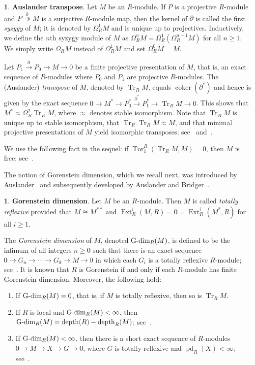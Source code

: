 \documentclass[11pt]{amsart}
\theoremstyle{definition}
\theoremstyle{definition}
\newtheorem{chunk}[thm]{\hspace*{-1.065ex}\bf}
\numberwithin{equation}{section}
\DeclareMathOperator{\Gdim}{\textnormal{G-dim}}
\DeclareMathOperator{\Tr}{Tr}
\DeclareMathOperator{\coker}{coker}
\DeclareMathOperator{\depth}{depth}
\DeclareMathOperator{\Ext}{Ext}
\DeclareMathOperator{\pd}{pd}
\DeclareMathOperator{\Tor}{Tor}
\begin{document}
\begin{chunk} \textbf{Auslander transpose}. \label{a1} Let $M$ be an $R$-module. If $P$ is a projective $R$-module and $P\overset{\partial}{\twoheadrightarrow} M$ is a surjective $R$-module map, then the kernel of $\partial$ is called the first
\emph{syzygy} of $M$; it is denoted by $\Omega^1_R M$ and is unique up to projectives. Inductively,
we define the $n$th syzygy module of $M$ as $\Omega_R^nM= \Omega^1_R(\Omega_R^{n-1}M)$ for all $n\geq 1$. We simply write $\Omega_R M$ instead of $\Omega^1_R M$ and set $\Omega_R^0M=M$.

Let  $P_1\overset{\partial}{\rightarrow}P_0 \overset{}{\rightarrow} M\to0$ be a finite projective presentation of $M$, that is, an exact sequence of $R$-modules where $P_0$ and $P_1$ are projective $R$-modules. The (Auslander) \emph{transpose} of $M$, denoted by $\Tr_R M$, equals $\coker({\partial}^*)$ and hence is given by the exact sequence
$0\rightarrow M^*\rightarrow P_0^*\overset{\partial^{\ast}}{\rightarrow} P_1^*\rightarrow \Tr_R M\rightarrow 0$. This shows that $M^*\approx \Omega_R^2\Tr_R M$, where $\approx$ denotes stable isomorphism. Note that $\Tr_R M$ is unique up to stable isomorphism, that $\Tr_R\Tr_R M \approx M$, and that minimal projective presentations of $M$ yield isomorphic transposes; see~\cite{AuBr} and~\cite[3.5]{Yo}.

We use the following fact in the sequel: if $\Tor_1^R(\Tr_R M, M)=0$, then $M$ is free; see~\cite[3.7 and 3.9]{Yo}.
\end{chunk}

The notion of Gorenstein dimension, which we recall next, was introduced by Auslander~\cite{Tome1} and subsequently developed by Auslander and Bridger~\cite{AuBr}.

\begin{chunk}\textbf{Gorenstein dimension}. \label{HD} Let $M$ be an $R$-module. Then $M$ is called \emph{totally reflexive} provided that $M\cong M^{**}$  and $\Ext^i_R(M,R)=0=\Ext^i_R(M^*,R)$ for all $i\geq 1$. 

The \emph{Gorenstein dimension} of $M$, denoted $\Gdim_R(M)$, is defined to be the infimum of all integers $n\geq 0$ such that there is an exact sequence $0\rightarrow G_n\rightarrow\cdots\rightarrow G_0\rightarrow  M \rightarrow 0$ in which each $G_i$ is a totally reflexive $R$-module; see~\cite{Tome1, AuBr}. It is known that $R$ is Gorenstein if and only if each $R$-module has finite Gorenstein dimension. Moreover, the following hold:
\begin{enumerate}[\rm(i)]
\item If $\Gdim_R(M)=0$, that is, if $M$ is totally reflexive, then so is $\Tr_R M$.
\item If $R$ is local and $\Gdim_R(M)<\infty$, then $\Gdim_R(M)=\depth(R)-\depth_R(M)$; see~\cite[4.13]{AuBr}.
\item If $\Gdim_R(M)<\infty$, then there is a short exact sequence of $R$-modules $0\to M \to X \to G \to 0$, where $G$ is totally reflexive and 
$\pd_R(X)<\infty$; see~\cite[2.17]{cfh}. 
\end{enumerate}
\end{chunk}
 
\end{document}
